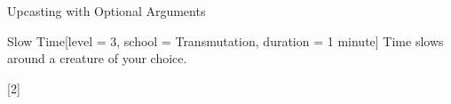 \begin{ExampleBlock}{Upcasting with Optional Arguments}
\begin{RpgSpell}{Slow Time}[level = 3, school = Transmutation, duration = 1 minute]
    Time slows around a creature of your choice.

    [2]
\end{RpgSpell}


\end{ExampleBlock}
